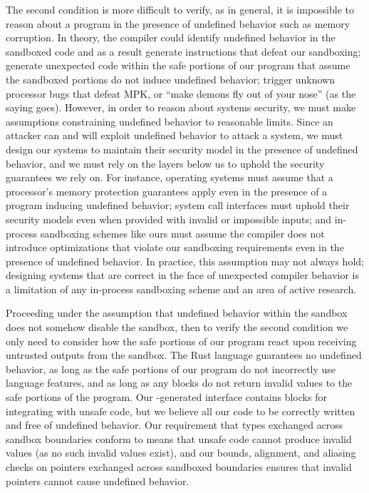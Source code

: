 The second condition is more difficult to verify, as in general, it is impossible to reason about a
program in the presence of undefined behavior such as memory corruption. In theory, the compiler
could identify undefined behavior in the sandboxed code and as a result generate 
instructions that defeat our sandboxing; generate unexpected code within the safe portions of our
program that assume the sandboxed portions do not induce undefined behavior; trigger unknown
processor bugs that defeat MPK, or ``make demons fly out of your nose'' (as the saying goes).
However, in order to reason about systems security, we must make assumptions constraining undefined
behavior to reasonable limits. Since an attacker can and will exploit undefined behavior to attack a
system, we must design our systems to maintain their security model in the presence of undefined
behavior, and we must rely on the layers below us to uphold the security guarantees we rely on. For
instance, operating systems must assume that a processor's memory protection guarantees apply even
in the presence of a program inducing undefined behavior; system call interfaces must uphold their
security models even when provided with invalid or impossible inputs; and in-process sandboxing
schemes like ours must assume the compiler does not introduce optimizations that violate our
sandboxing requirements even in the presence of undefined behavior. In practice, this assumption may
not always hold; designing systems that are correct in the face of unexpected compiler behavior is a
limitation of any in-process sandboxing scheme and an area of active research.

Proceeding under the assumption that undefined behavior within the sandbox does not somehow disable
the sandbox, then to verify the second condition we only need to consider how the safe portions of
our program react upon receiving untrusted outputs from the sandbox. The Rust language guarantees no
undefined behavior, as long as the safe portions of our program do not incorrectly use 
language features, and as long as any  blocks do not return invalid values to the safe
portions of the program. Our -generated interface contains  blocks for
integrating with unsafe code, but we believe all our  code to be correctly written and
free of undefined behavior. Our requirement that types exchanged across sandbox boundaries conform
to  means that unsafe code cannot produce invalid values (as no such
invalid values exist), and our bounds, alignment, and aliasing checks on pointers exchanged across
sandboxed boundaries ensures that invalid pointers cannot cause undefined behavior.

